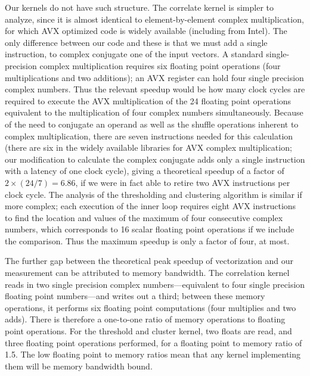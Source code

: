 Our kernels do not have such structure.  The correlate kernel is simpler to
analyze, since it is almost identical to element-by-element complex
multiplication, for which AVX optimized code is widely available (including from
Intel). The only difference between our code and these is that we must add a
single instruction, to complex conjugate one of the input vectors. A standard
single-precision complex multiplication requires six floating point operations
(four multiplications and two additions); an AVX register can hold four single
precision complex numbers. Thus the relevant speedup would be how many clock
cycles are required to execute the AVX multiplication of the 24 floating point
operations equivalent to the multiplication of four complex numbers
simultaneously. Because of the need to conjugate an operand as well as the
shuffle operations inherent to complex multiplication, there are seven
instructions needed for this calculation (there are six in the widely available
libraries for AVX complex multiplication; our modification to calculate the
complex conjugate adds only a single instruction with a latency of one clock
cycle),  giving a theoretical speedup of a factor of $2\times (24/7) = 6.86$, if
we were in fact able to retire two AVX instructions per clock cycle. The
analysis of the thresholding and clustering algorithm is similar if more
complex; each execution of the inner loop requires eight AVX instructions to
find the location and values of the maximum of four consecutive complex numbers,
which corresponds to 16 scalar floating point operations if we include the
comparison. Thus the maximum speedup is only a factor of four, at most. 

The further gap between the theoretical peak speedup of vectorization and our measurement can be attributed to memory bandwidth. The correlation kernel
reads in two single precision complex numbers---equivalent to four single
precision floating point numbers---and writes out a third; between these memory
operations, it performs six floating point computations (four multiplies and two
adds). There is therefore a one-to-one ratio of memory operations to floating
point operations.  For the threshold and cluster kernel, two floats are read,
and three floating point operations performed, for a floating point to memory
ratio of 1.5. The low floating point to memory ratios mean that any kernel
implementing them will be memory bandwidth bound.

